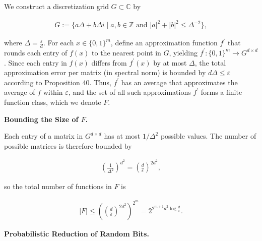 We construct a discretization grid $G\subset\mathbb{C}$ by\par


\[\begin{gathered}
G:=\{a\Delta+b\Delta i\mid a,b\in\mathbb{Z}\text{ and }\left|a\right|^{2}+\left|b\right|^{2}\leq\Delta^{-2}\},
\end{gathered}\]


where $\Delta=\frac{\varepsilon}{d}$.
For each $x\in\{0,1\}^{m}$, define an approximation function $f^{\prime}$ that rounds each entry of $f(x)$ to the nearest point in $G$, yielding $f^{\prime}:\{0,1\}^{m}\to G^{d\times d}$. Since each entry in $f(x)$ differs from $f^{\prime}(x)$ by at most $\Delta$, the total approximation error per matrix (in spectral norm) is bounded by $d\Delta\leq\varepsilon$ according to Proposition 40. Thus, $f^{\prime}$ has an average that approximates the average of $f$ within $\varepsilon$, and the set of all such approximations $f^{\prime}$ forms a finite function class, which we denote $F$.\par





\par\medskip\noindent\textbf{Bounding the Size of $F$.}\par




Each entry of a matrix in $G^{d\times d}$ has at most $1/\Delta^{2}$
possible values. The number of possible matrices is therefore bounded by\par


\[\begin{gathered}
\left(\frac{1}{\Delta^{2}}\right)^{d^{2}}=\left(\frac{d}{\varepsilon}\right)^{2d^{2}},
\end{gathered}\]


so the total number of functions in $F$ is\par


\[\begin{gathered}
\left|F\right|\leq\left(\left(\frac{d}{\varepsilon}\right)^{2d^{2}}\right)^{2^{m}}=2^{2^{m+1}d^{2}\log\frac{d}{\varepsilon}}.
\end{gathered}\]





\par\medskip\noindent\textbf{Probabilistic Reduction of Random Bits.}\par





